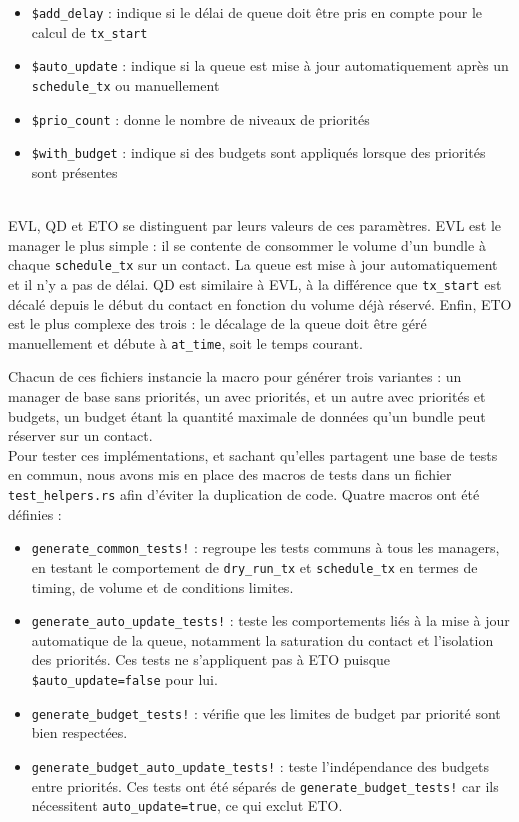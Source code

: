\documentclass{article}
\begin{document}
\begin{itemize}
    \item \texttt{\$add\_delay} : indique si le délai de queue doit être pris en compte pour le calcul de \texttt{tx\_start}
    \item \texttt{\$auto\_update} : indique si la queue est mise à jour automatiquement après un \texttt{schedule\_tx} ou manuellement
    \item \texttt{\$prio\_count} : donne le nombre de niveaux de priorités
    \item \texttt{\$with\_budget} : indique si des budgets sont appliqués lorsque des priorités sont présentes
\end{itemize}~\\
EVL, QD et ETO se distinguent par leurs valeurs de ces paramètres. EVL est le manager le plus simple : il se contente de consommer le volume d'un bundle à chaque \texttt{schedule\_tx} sur un contact. La queue est mise à jour automatiquement et il n'y a pas de délai. QD est similaire à EVL, à la différence que \texttt{tx\_start} est décalé depuis le début du contact en fonction du volume déjà réservé. Enfin, ETO est le plus complexe des trois : le décalage de la queue doit être géré manuellement et débute à \texttt{at\_time}, soit le temps courant.

Chacun de ces fichiers instancie la macro pour générer trois variantes : un manager de base sans priorités, un avec priorités, et un autre avec priorités et budgets, un budget étant la quantité maximale de données qu'un bundle peut réserver sur un contact.\\


Pour tester ces implémentations, et sachant qu'elles partagent une base de tests en commun, nous avons mis en place des macros de tests dans un fichier \texttt{test\_helpers.rs} afin d'éviter la duplication de code. Quatre macros ont été définies :

\begin{itemize}
    \item \texttt{generate\_common\_tests!} : regroupe les tests communs à tous les managers, en testant le comportement de \texttt{dry\_run\_tx} et \texttt{schedule\_tx} en termes de timing, de volume et de conditions limites.

    \item \texttt{generate\_auto\_update\_tests!} : teste les comportements liés à la mise à jour automatique de la queue, notamment la saturation du contact et l'isolation des priorités. Ces tests ne s'appliquent pas à ETO puisque \texttt{\$auto\_update=false} pour lui.

    \item \texttt{generate\_budget\_tests!} : vérifie que les limites de budget par priorité sont bien respectées.

    \item \texttt{generate\_budget\_auto\_update\_tests!} : teste l'indépendance des budgets entre priorités. Ces tests ont été séparés de \texttt{generate\_budget\_tests!} car ils nécessitent \texttt{auto\_update=true}, ce qui exclut ETO. \\
\end{itemize}
\end{document}
